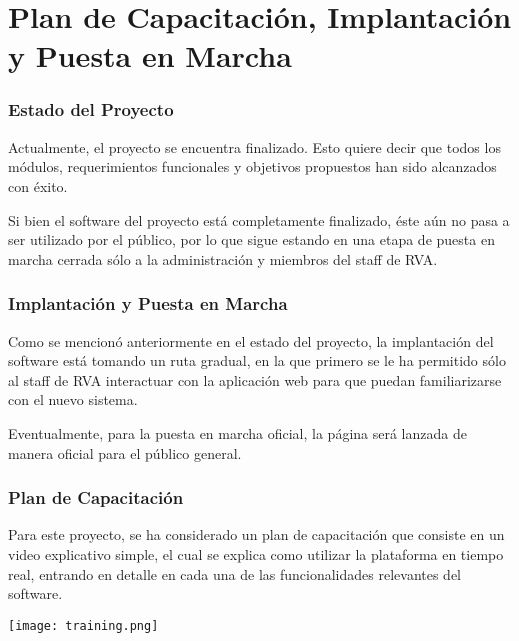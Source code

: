 \chapter{Plan de Capacitación, Implantación y Puesta en Marcha}

\subsection{Estado del Proyecto}
Actualmente, el proyecto se encuentra finalizado. Esto quiere decir que todos los módulos, requerimientos funcionales y objetivos propuestos han sido alcanzados con éxito.

Si bien el software del proyecto está completamente finalizado, éste aún no pasa a ser utilizado por el público, por lo que sigue estando en una etapa de puesta en marcha cerrada sólo a la administración y miembros del staff de RVA.

\subsection{Implantación y Puesta en Marcha}
Como se mencionó anteriormente en el estado del proyecto, la implantación del software está tomando un ruta gradual, en la que primero se le ha permitido sólo al staff de RVA interactuar con la aplicación web para que puedan familiarizarse con el nuevo sistema.

Eventualmente, para la puesta en marcha oficial, la página será lanzada de manera oficial para el público general.

\subsection{Plan de Capacitación}
Para este proyecto, se ha considerado un plan de capacitación que consiste en un video explicativo simple, el cual se explica como utilizar la plataforma en tiempo real, entrando en detalle en cada una de las funcionalidades relevantes del software.

\texttt{[image: training.png]}
